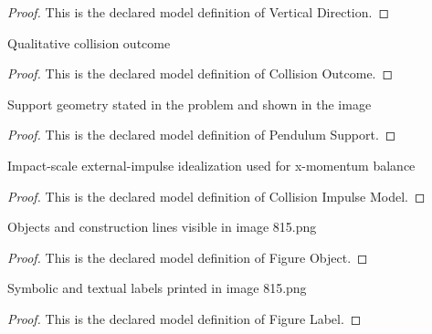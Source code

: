 \begin{proof}
  This is the declared model definition of Vertical Direction.
\end{proof}
\begin{definition}
  \label{def:physics:phyx-mini-0815:phyxminiproblems-problemphyxmini0815-collisionoutcome}
  Qualitative collision outcome
\end{definition}
\begin{proof}
  This is the declared model definition of Collision Outcome.
\end{proof}
\begin{definition}
  \label{def:physics:phyx-mini-0815:phyxminiproblems-problemphyxmini0815-pendulumsupport}
  Support geometry stated in the problem and shown in the image
\end{definition}
\begin{proof}
  This is the declared model definition of Pendulum Support.
\end{proof}
\begin{definition}
  \label{def:physics:phyx-mini-0815:phyxminiproblems-problemphyxmini0815-collisionimpulsemodel}
  Impact-scale external-impulse idealization used for x-momentum balance
\end{definition}
\begin{proof}
  This is the declared model definition of Collision Impulse Model.
\end{proof}
\begin{definition}
  \label{def:physics:phyx-mini-0815:phyxminiproblems-problemphyxmini0815-figureobject}
  Objects and construction lines visible in image 815.png
\end{definition}
\begin{proof}
  This is the declared model definition of Figure Object.
\end{proof}
\begin{definition}
  \label{def:physics:phyx-mini-0815:phyxminiproblems-problemphyxmini0815-figurelabel}
  Symbolic and textual labels printed in image 815.png
\end{definition}
\begin{proof}
  This is the declared model definition of Figure Label.
\end{proof}

